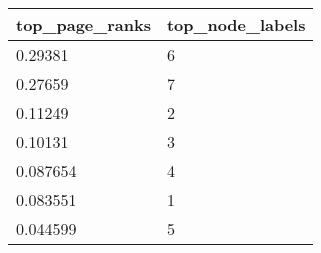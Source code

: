 \begin{tabular}{ll}
top_page_ranks & top_node_labels \\ 
\hline 
0.29381 & 6 \\ 
0.27659 & 7 \\ 
0.11249 & 2 \\ 
0.10131 & 3 \\ 
0.087654 & 4 \\ 
0.083551 & 1 \\ 
0.044599 & 5 \\ 
\hline 
\end{tabular}